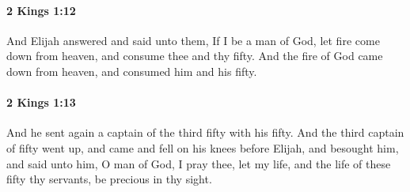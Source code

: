 		\paragraph{2 Kings 1:12} %
			\label{2KINGS-1-12}

			And Elijah answered and said unto them, If I be a man of God, let fire come down from heaven, and consume thee and thy fifty. And the fire of God came down from heaven, and consumed him and his fifty.


		\paragraph{2 Kings 1:13} %
			\label{2KINGS-1-13}

			And he sent again a captain of the third fifty with his fifty. And the third captain of fifty went up, and came and fell on his knees before Elijah, and besought him, and said unto him, O man of God, I pray thee, let my life, and the life of these fifty thy servants, be precious in thy sight.

